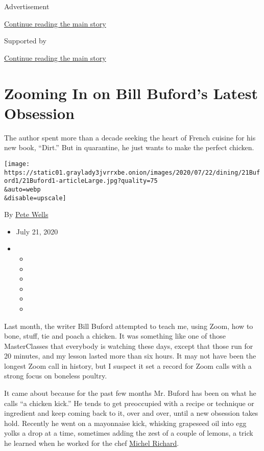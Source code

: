 Advertisement

\protect\hyperlink{after-top}{Continue reading the main story}

Supported by

\protect\hyperlink{after-sponsor}{Continue reading the main story}

\hypertarget{zooming-in-on-bill-bufords-latest-obsession}{%
\section{Zooming In on Bill Buford's Latest
Obsession}\label{zooming-in-on-bill-bufords-latest-obsession}}

The author spent more than a decade seeking the heart of French cuisine
for his new book, ``Dirt.'' But in quarantine, he just wants to make the
perfect chicken.

\texttt{[image: https://static01.graylady3jvrrxbe.onion/images/2020/07/22/dining/21Buford1/21Buford1-articleLarge.jpg?quality=75\\\&auto=webp\\\&disable=upscale]}

By \href{https://www.nytimes3xbfgragh.onion/by/pete-wells}{Pete Wells}

\begin{itemize}
\item
  July 21, 2020
\item
  \begin{itemize}
  \item
  \item
  \item
  \item
  \item
  \item
  \end{itemize}
\end{itemize}

Last month, the writer Bill Buford attempted to teach me, using Zoom,
how to bone, stuff, tie and poach a chicken. It was something like one
of those MasterClasses that everybody is watching these days, except
that those run for 20 minutes, and my lesson lasted more than six hours.
It may not have been the longest Zoom call in history, but I suspect it
set a record for Zoom calls with a strong focus on boneless poultry.

It came about because for the past few months Mr. Buford has been on
what he calls ``a chicken kick.'' He tends to get preoccupied with a
recipe or technique or ingredient and keep coming back to it, over and
over, until a new obsession takes hold. Recently he went on a mayonnaise
kick, whisking grapeseed oil into egg yolks a drop at a time, sometimes
adding the zest of a couple of lemons, a trick he learned when he worked
for the chef
\href{https://www.nytimes3xbfgragh.onion/2016/08/16/dining/michel-richard-dead.html}{Michel
Richard}.

